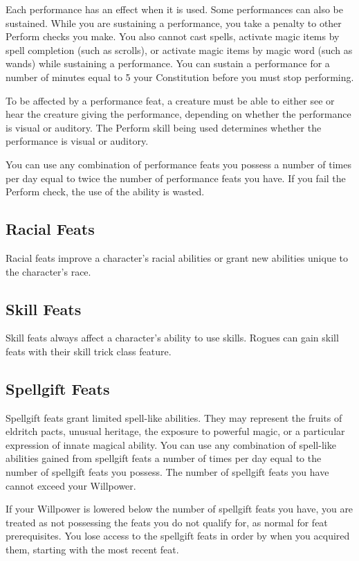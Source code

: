 Each performance has an effect when it is used.
Some performances can also be sustained.
While you are sustaining a performance, you take a  penalty to other Perform checks you make.
You also cannot cast spells, activate magic items by spell completion (such as scrolls), or activate magic items by magic word (such as wands) while sustaining a performance.
You can sustain a performance for a number of minutes equal to 5 \add your Constitution before you must stop performing.

To be affected by a performance feat, a creature must be able to either see or hear the creature giving the performance, depending on whether the performance is visual or auditory.
The Perform skill being used determines whether the performance is visual or auditory.

You can use any combination of performance feats you possess a number of times per day equal to twice the number of performance feats you have.
If you fail the Perform check, the use of the ability is wasted.

\subsection{Racial Feats}\label{Racial Feats}
Racial feats improve a character's racial abilities or grant new abilities unique to the character's race.

\subsection{Skill Feats}
Skill feats always affect a character's ability to use skills.
Rogues can gain skill feats with their skill trick class feature.

\subsection{Spellgift Feats}
Spellgift feats grant limited spell-like abilities.
They may represent the fruits of eldritch pacts, unusual heritage, the exposure to powerful magic, or a particular expression of innate magical ability.
You can use any combination of spell-like abilities gained from spellgift feats a number of times per day equal to the number of spellgift feats you possess.
The number of spellgift feats you have cannot exceed your Willpower.

If your Willpower is lowered below the number of spellgift feats you have, you are treated as not possessing the feats you do not qualify for, as normal for feat prerequisites.
You lose access to the spellgift feats in order by when you acquired them, starting with the most recent feat.

